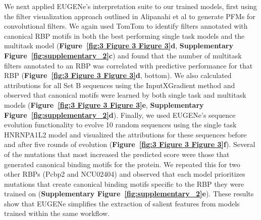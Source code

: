 We next applied EUGENe’s interpretation suite to our trained models, first using the filter visualization approach outlined in Alipanahi et al to generate PFMs for convolutional filters. We again used TomTom to identify filters annotated with canonical RBP motifs\cite{Ray2013-yd} in both the best performing single task models and the multitask model (\textbf{Figure~\ref{fig:3 Figure 3 Figure 3}d}, \textbf{Supplementary Figure~\ref{fig:supplementary_2}c}) and found that the number of multitask filters annotated to an RBP was correlated with predictive performance for that RBP (\textbf{Figure~\ref{fig:3 Figure 3 Figure 3}d}, bottom). We also calculated attributions for all Set B sequences using the InputXGradient method\cite{Shrikumar2016-lf} and observed that canonical motifs were learned by both single task and multitask models (\textbf{Figure~\ref{fig:3 Figure 3 Figure 3}e}, \textbf{Supplementary Figure~\ref{fig:supplementary_2}d}). Finally, we used EUGENe’s sequence evolution functionality to evolve 10 random sequences using the single task HNRNPA1L2 model and visualized the attributions for these sequences before and after five rounds of evolution (\textbf{Figure~\ref{fig:3 Figure 3 Figure 3}f}). Several of the mutations that most increased the predicted score were those that generated canonical binding motifs for the protein. We repeated this for two other RBPs (Pcbp2 and NCU02404) and observed that each model prioritizes mutations that create canonical binding motifs specific to the RBP they were trained on (\textbf{Supplementary Figure~\ref{fig:supplementary_2}e}). These results show that EUGENe simplifies the extraction of salient features from models trained within the same workflow.

